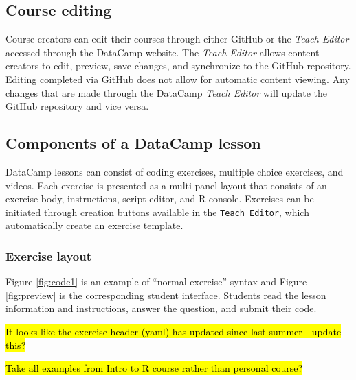 \documentclass{tise_style_doi}
\begin{document}
\subsection{Course editing}

Course creators can edit their courses through either GitHub or the \textit{Teach Editor}
accessed through the DataCamp website. The \textit{Teach Editor} allows content
creators to edit, preview, save changes, and synchronize to the GitHub repository.
Editing completed via GitHub does not allow for automatic content viewing. Any changes
that are made through the DataCamp \textit{Teach Editor} will update the GitHub
repository and vice versa.

\subsection{Components of a DataCamp lesson}

DataCamp lessons can consist of coding exercises, multiple choice exercises,
and videos.  Each exercise is presented as a multi-panel layout that consists
of an exercise body, instructions, script editor, and R console.  Exercises
can be initiated through creation buttons available in the \texttt{Teach Editor},
which automatically create an exercise template.

\subsubsection{Exercise layout}

Figure \ref{fig:code1} is an example of ``normal exercise'' syntax and Figure
\ref{fig:preview} is the corresponding student interface. Students read the
lesson information and instructions, answer the question, and submit their code.

\hl{It looks like the exercise header (yaml) has updated since last summer - update this?}

\hl{Take all examples from Intro to R course rather than personal course?}
\end{document}

